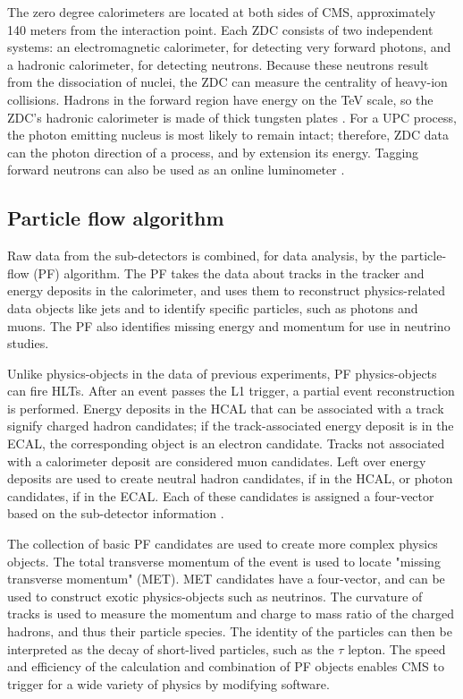 The zero degree calorimeters are located at both sides of CMS, approximately 140 meters from the interaction point. Each ZDC consists of two independent systems: an electromagnetic calorimeter, for detecting very forward photons, and a hadronic calorimeter, for detecting neutrons. Because these neutrons result from the dissociation of nuclei, the ZDC can measure the centrality of heavy-ion collisions. Hadrons in the forward region have energy on the TeV scale, so the ZDC's hadronic calorimeter is made of thick tungsten plates \cite{Grachov:2006ke}. For a UPC process, the photon emitting nucleus is most likely to remain intact; therefore, ZDC data can the photon direction of a process, and by extension its energy. Tagging forward neutrons can also be used as an online luminometer \cite{emPCite3}.

\subsection{Particle flow algorithm}

Raw data from the sub-detectors is combined, for data analysis, by the particle-flow (PF) algorithm. The PF takes the data about tracks in the tracker and energy deposits in the calorimeter, and uses them to reconstruct physics-related data objects like jets and to identify specific particles, such as photons and muons. The PF also identifies missing energy and momentum for use in neutrino studies. 

Unlike physics-objects in the data of previous experiments, PF physics-objects can fire HLTs. After an event passes the L1 trigger, a partial event reconstruction is performed. Energy deposits in the HCAL that can be associated with a track signify charged hadron candidates; if the track-associated energy deposit is in the ECAL, the corresponding object is an electron candidate. Tracks not associated with a calorimeter deposit are considered muon candidates. Left over energy deposits are used to create neutral hadron candidates, if in the HCAL, or photon candidates, if in the ECAL. Each of these candidates is assigned a four-vector based on the sub-detector information \cite{Beaudette:2014cea}. 

The collection of basic PF candidates are used to create more complex physics objects. The total transverse momentum of the event is used to locate "missing transverse momentum" (MET). MET candidates have a four-vector, and can be used to construct exotic physics-objects such as neutrinos. The curvature of tracks is used to measure the momentum and charge to mass ratio of the charged hadrons, and thus their particle species. The identity of the particles can then be interpreted as the decay of short-lived particles, such as the $\tau$ lepton. The speed and efficiency of the calculation and combination of PF objects enables CMS to trigger for a wide variety of physics by modifying software.

